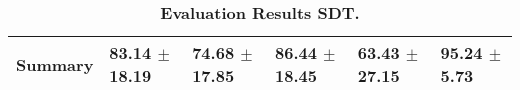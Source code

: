 \begin{table}[htb]
{\begin{tabular}{llllll}
\midrule
\textbf{Summary                                  } &                  \phantom{0}83.14 $\pm$ 18.19 &                      \phantom{0}74.68 $\pm$ 17.85 &                  \phantom{0}86.44 $\pm$ 18.45 &                  \phantom{0}63.43 $\pm$ 27.15 &  \phantom{0}95.24 $\pm$ \phantom{0}5.73 \\
\bottomrule
\end{tabular}%
}
\caption{\textbf{Evaluation Results SDT.}}
\label{tab:eval-results}
\end{table}


